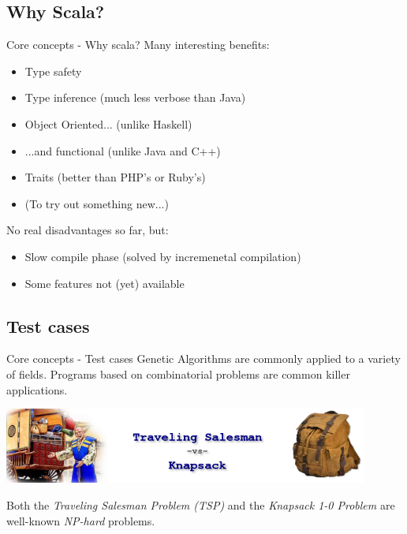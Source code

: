 \documentclass{beamer}
\begin{document}
\subsection{Why Scala?}
\begin{frame}{Core concepts - Why scala?}
  Many interesting benefits:
  \begin{itemize}
   \item Type safety
   \item Type inference (much less verbose than Java)
   \item Object Oriented... (unlike Haskell)
   \item ...and functional (unlike Java and C++)
   \item Traits (better than PHP's or Ruby's)
   \item \tiny (To try out something new...)
  \end{itemize}
  No real disadvantages so far, but:
  \begin{itemize}
   \item Slow compile phase (solved by incremenetal compilation)
   \item Some features not (yet) available
  \end{itemize}

\end{frame}


\subsection{Test cases}
\begin{frame}{Core concepts - Test cases}
  Genetic Algorithms are commonly applied to a variety of fields.
  Programs based on combinatorial problems are common killer applications.
  \begin{center}
   \includegraphics[width=0.9\textwidth]{images/test-cases}
  \end{center}
  Both the \emph{Traveling Salesman Problem (TSP)} and the \emph{Knapsack 1-0 Problem}
  are well-known \emph{NP-hard} problems.
\end{frame}
\end{document}
